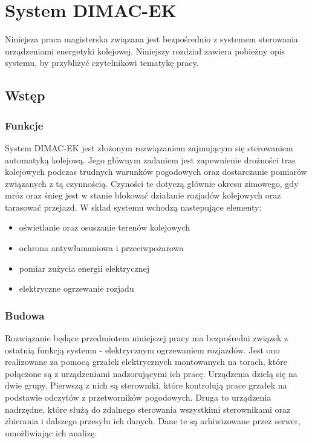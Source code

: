 \chapter{System DIMAC-EK}

Niniejsza praca magisterska związana jest bezpośrednio z systemem sterowania urządzeniami energetyki kolejowej. Niniejszy rozdział zawiera pobieżny opis systemu, by przybliżyć czytelnikowi tematykę pracy.

\section{Wstęp}

\subsection{Funkcje}

System DIMAC-EK jest złożonym rozwiązaniem zajmującym się sterowaniem automatyką kolejową.\cite{dimacek-katalog} Jego głównym zadaniem jest zapewnienie drożności tras kolejowych podczas trudnych warunków pogodowych oraz dostarczanie pomiarów związanych z tą czynnością. Czyności te dotyczą głównie okresu zimowego, gdy mróz oraz śnieg jest w stanie blokować działanie rozjadów kolejowych oraz tarasować przejazd. W skład systemu wchodzą nastepujące elementy:

\begin{itemize}
\item oświetlanie oraz osuszanie terenów kolejowych
\item ochrona antywłamaniowa i przeciwpożarowa
\item pomiar zużycia energii elektrycznej
\item elektryczne ogrzewanie rozjadu
\end{itemize}

\subsection{Budowa}
Rozwiązanie będące przedmiotem niniejszej pracy ma bezpośredni związek z ostatnią funkcją systemu - elektrycznym ogrzewaniem rozjazdów. Jest ono realizowane za pomocą grzałek elektrycznych montowanych na torach, które połączone są z urządzeniami nadzorującymi ich pracę. Urządzenia dzielą się na dwie grupy. Pierwszą z nich są sterowniki, które kontrolują  prace grzałek na podstawie odczytów z przetworników pogodowych. Druga to urządzenia nadrzędne, które służą do zdalnego sterowania wszystkimi sterownikami oraz zbierania i dalszego przesyłu ich danych. Dane te są arhiwizowane przez serwer, umożliwiając ich analizę.

